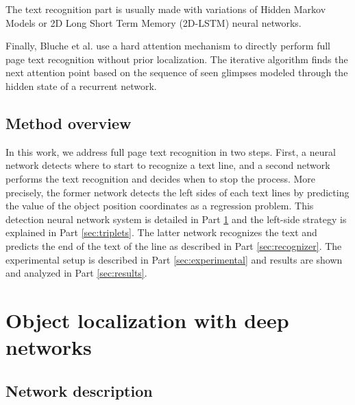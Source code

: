 \documentclass[conference]{IEEEtran}
\begin{document}
The text recognition part is usually made with variations of Hidden Markov Models \cite{bertolami2008hidden} or 2D Long Short Term Memory (2D-LSTM) \cite{Graves2DLSTM2009} neural networks.

Finally, Bluche et al. \cite{BlucheNIPS2016} use a hard attention mechanism to directly perform full page text recognition without prior localization. The iterative algorithm finds the next attention point based on the sequence of seen glimpses modeled through the hidden state of a recurrent network.

\subsection{Method overview}
In this work, we address full page text recognition in two steps. First, a neural network detects where to start to recognize a text line, and a second network performs the text recognition and decides when to stop the process. More precisely, the former network detects the left sides of each text lines by predicting the value of the object position coordinates as a regression problem. This detection neural network system is detailed in Part \ref{sec:objectLocalization} and the left-side strategy is explained in Part \ref{sec:triplets}. The latter network recognizes the text and predicts the end of the text of the line  as described in Part \ref{sec:recognizer}. The experimental setup is described in Part \ref{sec:experimental} and results are shown and analyzed in Part \ref{sec:results}.

\section{Object localization with deep networks}
\label{sec:objectLocalization}

\subsection{Network description}
\end{document}
